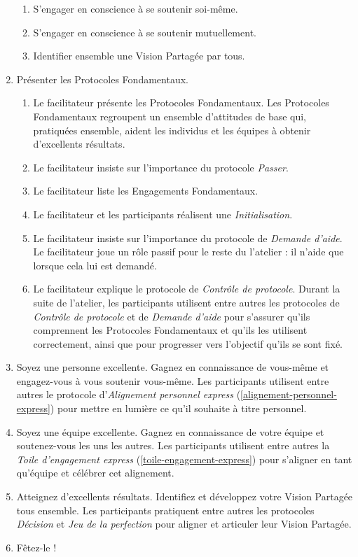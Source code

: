 \documentclass[11pt]{book}
\newcommand*{\numref}[1]{{\hyperref[{#1}]{\autoref*{#1}}}}
\begin{document}
\begin{enumerate}
\begin{enumerate}
	      	\item S'engager en conscience à se soutenir soi-même.
	      	\item S'engager en conscience à se soutenir mutuellement.
	      	\item Identifier ensemble une Vision Partagée par tous.
	      \end{enumerate}
	\item Présenter les Protocoles Fondamentaux.
	      \begin{enumerate}
	      	\item Le facilitateur présente les Protocoles Fondamentaux. Les Protocoles Fondamentaux regroupent un ensemble d'attitudes de base qui, pratiquées
	      	      ensemble, aident les individus et les équipes à obtenir d'excellents résultats.
	      	\item Le facilitateur insiste sur l'importance du protocole \emph{Passer}.
	      	\item Le facilitateur liste les Engagements Fondamentaux.
	      	\item Le facilitateur et les participants réalisent une \emph{Initialisation}.
	      	\item Le facilitateur insiste sur l'importance du protocole de \emph{Demande d'aide}. Le facilitateur joue un rôle passif pour le reste du l'atelier :
	      	      il n'aide que lorsque cela lui est demandé.
	      	\item Le facilitateur explique le protocole de \emph{Contrôle de protocole}. Durant la suite de l'atelier, les participants utilisent entre autres les 
	      	      protocoles de \emph{Contrôle de protocole} et de \emph{Demande d'aide} pour s'assurer qu'ils comprennent les Protocoles Fondamentaux et qu'ils les
	      	      utilisent correctement, ainsi que pour progresser vers l'objectif qu'ils se sont fixé.
	      \end{enumerate}
	\item Soyez une personne excellente. Gagnez en connaissance de vous-même et engagez-vous à vous soutenir vous-même. Les participants utilisent entre 
	      autres le protocole d'\emph{Alignement personnel express} (\numref{alignement-personnel-express}) pour mettre en lumière ce qu'il souhaite à titre personnel.
   	\item Soyez une équipe excellente. Gagnez en connaissance de votre équipe et soutenez-vous les uns les autres. Les participants utilisent entre autres la 
   	      \emph{Toile d'engagement express} (\numref{toile-engagement-express}) pour s'aligner en tant qu'équipe et célébrer cet alignement. 
   	\item Atteignez d'excellents résultats. Identifiez et développez votre Vision Partagée tous ensemble. Les participants pratiquent entre autres les protocoles 
   	      \emph{Décision} et \emph{Jeu de la perfection} pour aligner et articuler leur Vision Partagée.
   	\item Fêtez-le !
\end{enumerate}
\end{document}
